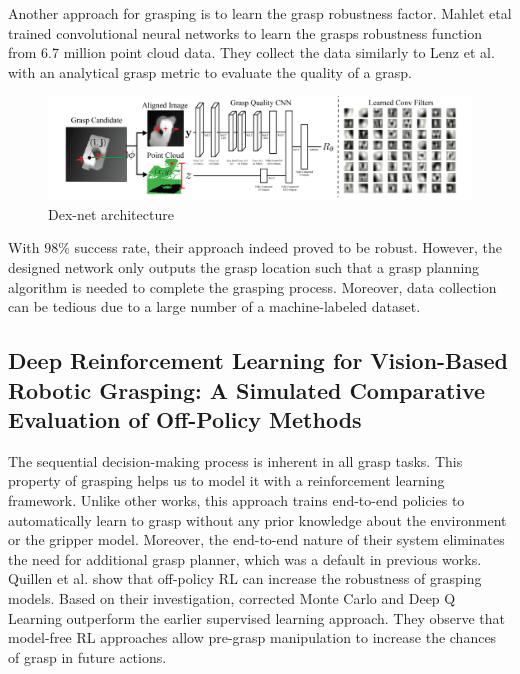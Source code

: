 Another approach for grasping is to learn the grasp robustness factor. Mahlet etal  trained convolutional neural networks to learn the grasps robustness function from 6.7 million point cloud data. They collect the data similarly to Lenz et al. with an analytical grasp metric to evaluate the quality of a grasp. 

\begin{figure}[htbp]
    \centering
    \includegraphics[width=1.\textwidth]{figures/dexnet}
    \caption{Dex-net architecture \cite{Lenz2013}}
    \label{fig:dexnet}
\end{figure}

With \(98\%\) success rate, their approach indeed proved to be robust. However, the designed network only outputs the grasp location such that a grasp planning algorithm is needed to complete the grasping process. Moreover, data collection can be tedious due to a large number of a machine-labeled dataset.


\subsection{Deep Reinforcement Learning for Vision-Based Robotic Grasping: A Simulated Comparative Evaluation of Off-Policy Methods}

The sequential decision-making process is inherent in all grasp tasks. This property of grasping helps us to model it with a reinforcement learning framework. Unlike other works, this approach trains end-to-end policies to automatically learn to grasp without any prior knowledge about the environment or the gripper model. Moreover, the end-to-end nature of their system eliminates the need for additional grasp planner, which was a default in previous works. 
Quillen et al. show that off-policy RL can increase the robustness of grasping models. Based on their investigation, corrected Monte Carlo and Deep Q Learning outperform the earlier supervised learning approach. They observe that model-free RL approaches allow pre-grasp manipulation to increase the chances of grasp in future actions. 

